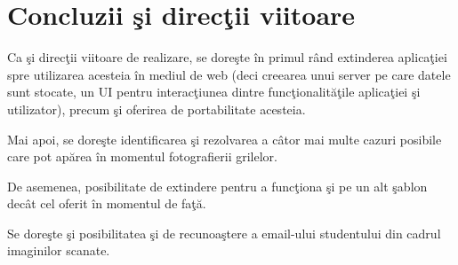 \documentclass{report}
\begin{document}
\chapter{Concluzii \c si direc\c tii viitoare}

Ca \c si direc\c tii viitoare de realizare, se dore\c ste în primul rând extinderea aplica\c tiei spre utilizarea acesteia în mediul de web (deci creearea unui server pe care datele sunt stocate, un UI pentru interac\c tiunea dintre func\c tionalit\u a\c tile aplica\c tiei \c si utilizator), precum \c si oferirea de portabilitate acesteia.

Mai apoi, se dore\c ste identificarea \c si rezolvarea a câtor mai multe cazuri posibile care pot ap\u area în momentul fotografierii grilelor.

De asemenea, posibilitate de extindere pentru a func\c tiona \c si pe un alt \c sablon decât cel oferit în momentul de fa\c t\u a.

Se dore\c ste \c si posibilitatea \c si de recunoa\c stere a email-ului studentului din cadrul imaginilor scanate. 

	
		
\end{document}
